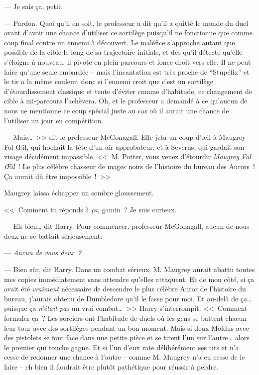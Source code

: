 --- Je sais ça, petit.

--- Pardon. Quoi qu'il en soit, le professeur a dit qu'il a quitté le monde du duel avant d'avoir une chance d'utiliser ce sortilège puisqu'il ne fonctionne que comme coup final contre un ennemi à découvert. Le maléfice s'approche autant que possible de la cible le long de sa trajectoire initiale, et dès qu'il détecte qu'elle s'éloigne à nouveau, il pivote en plein parcours et fonce droit vers elle. Il ne peut faire qu'une seule embardée -- mais l'incantation est très proche de “Stupéfix” et le tir a la même couleur, donc si l'ennemi croit que c'est un sortilège d'étourdissement classique et tente d'éviter comme d'habitude, ce changement de cible à mi-parcours l'achèvera. Oh, et le professeur a demandé à ce qu'aucun de nous ne mentionne ce coup spécial juste au cas où il aurait une chance de l'utiliser un jour en compétition.

--- Mais…~>> dit le professeur McGonagall. Elle jeta un coup d'œil à Maugrey Fol-Œil, qui hochait la tête d'un air approbateur, et à Severus, qui gardait son visage décidément impassible. <<~M. Potter, vous venez d'étourdir \emph{Maugrey Fol Œil}~! Le plus célèbre chasseur de mages noirs de l'histoire du bureau des Aurors~! Ça aurait dû être impossible~!~>>

Maugrey laissa échapper un sombre gloussement.

<<~Comment tu réponds à \emph{ça}, gamin~? Je suis curieux.

--- Eh bien… dit Harry. Pour commencer, professeur McGonagall, aucun de nous deux ne se battait sérieusement.

--- \emph{Aucun de vous deux~?}

--- Bien sûr, dit Harry. Dans un combat sérieux, M. Maugrey aurait abattu toutes mes copies immédiatement sans attendre qu'elles attaquent. Et de mon côté, si ça avait été \emph{vraiment} nécessaire de descendre le plus célèbre Auror de l'histoire du bureau, j'aurais obtenu de Dumbledore qu'il le fasse pour moi. Et au-delà de ça… puisque ça \emph{n'était pas} un vrai combat…~>> Harry s'interrompit. <<~Comment formuler ça~? Les sorciers ont l'habitude de duels où les gens se battent chacun leur tour avec des sortilèges pendant un bon moment. Mais si deux Moldus avec des pistolets se font face dans une petite pièce et se tirent l'un sur l'autre… alors le premier qui touche gagne. Et si l'un d'eux rate délibérément ses tirs et n'a cesse de redonner une chance à l'autre -- comme M. Maugrey n'a eu cesse de le faire -- eh bien il faudrait être plutôt pathétique pour réussir à perdre.

